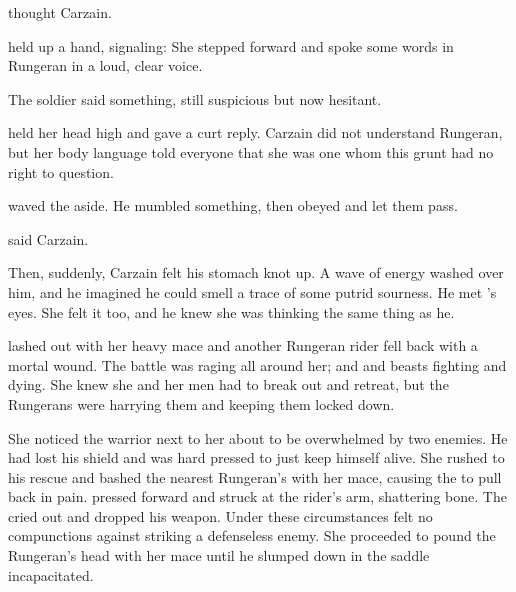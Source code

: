  thought Carzain.

\Sanyor held up a hand, signaling: 
She stepped forward and spoke some words in Rungeran in a loud, clear voice. 

The soldier said something, still suspicious but now hesitant. 

\Sanyor held her head high and gave a curt reply. 
Carzain did not understand Rungeran, but her body language told everyone that she was one whom this grunt had no right to question. 

\Sanyor waved the \human aside. 
He mumbled something, then obeyed and let them pass. 

 said Carzain.

Then, suddenly, Carzain felt his stomach knot up. 
A wave of energy washed over him, and he imagined he could smell a trace of some putrid sourness. 
He met \Sanyor's eyes. 
She felt it too, and he knew she was thinking the same thing as he.






\begin{comment}
  \subsection{\Dornaer under fire}
\end{comment}
\Dornaer lashed out with her heavy mace and another Rungeran rider fell back with a mortal wound. 
The battle was raging all around her; \scathae and \humans and beasts fighting and dying.
She knew she and her men had to break out and retreat, but the Rungerans were harrying them and keeping them locked down. 

She noticed the warrior next to her about to be overwhelmed by two enemies. 
He had lost his shield and was hard pressed to just keep himself alive. 
She rushed to his rescue and bashed the nearest Rungeran's \relc with her mace, causing the \saurian to pull back in pain.
\Dornaer pressed forward and struck at the rider's arm, shattering bone. 
The \human cried out and dropped his weapon. 
Under these circumstances \Dornaer felt no compunctions against striking a defenseless enemy. 
She proceeded to pound the Rungeran's head with her mace until he slumped down in the saddle incapacitated. 

